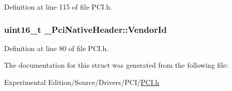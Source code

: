 Definition at line 115 of file P\+C\+I.\+h.

\subsubsection[{\texorpdfstring{Vendor\+Id}{VendorId}}]{\setlength{\rightskip}{0pt plus 5cm}uint16\+\_\+t \+\_\+\+Pci\+Native\+Header\+::\+Vendor\+Id}\hypertarget{struct__PciNativeHeader_acc809b557a84fbe99da19b442210e6a1}{}\label{struct__PciNativeHeader_acc809b557a84fbe99da19b442210e6a1}


Definition at line 80 of file P\+C\+I.\+h.



The documentation for this struct was generated from the following file\+:\begin{DoxyCompactItemize}
\item 
Experimental Edition/\+Source/\+Drivers/\+P\+C\+I/\hyperlink{PCI_8h}{P\+C\+I.\+h}\end{DoxyCompactItemize}
